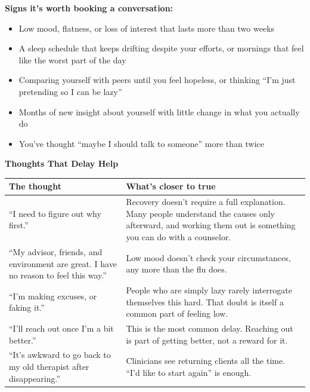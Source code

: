 \documentclass[11pt,a4paper]{article}
\begin{document}
\textbf{Signs it's worth booking a conversation:}
\begin{itemize}
    \item Low mood, flatness, or loss of interest that lasts more than two weeks
    \item A sleep schedule that keeps drifting despite your efforts, or mornings that feel like the worst part of the day
    \item Comparing yourself with peers until you feel hopeless, or thinking ``I'm just pretending so I can be lazy''
    \item Months of new insight about yourself with little change in what you actually do
    \item You've thought ``maybe I should talk to someone'' more than twice
\end{itemize}

\textbf{Thoughts That Delay Help}

\begin{table}[H]
\centering
\small
\begin{tabular}{@{}p{5cm}p{7.6cm}@{}}
\toprule
\textbf{The thought} & \textbf{What's closer to true} \\
\midrule
``I need to figure out why first.'' & Recovery doesn't require a full explanation. Many people understand the causes only afterward, and working them out is something you can do with a counselor. \\
\midrule
``My advisor, friends, and environment are great. I have no reason to feel this way.'' & Low mood doesn't check your circumstances, any more than the flu does. \\
\midrule
``I'm making excuses, or faking it.'' & People who are simply lazy rarely interrogate themselves this hard. That doubt is itself a common part of feeling low. \\
\midrule
``I'll reach out once I'm a bit better.'' & This is the most common delay. Reaching out is part of getting better, not a reward for it. \\
\midrule
``It's awkward to go back to my old therapist after disappearing.'' & Clinicians see returning clients all the time. ``I'd like to start again'' is enough. \\
\bottomrule
\end{tabular}
\end{table}
\end{document}
